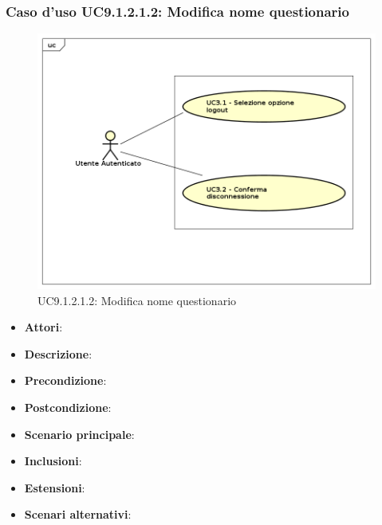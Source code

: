 					\subsubsection{Caso d'uso UC9.1.2.1.2: Modifica nome questionario}
					\label{UC9.1.2.1.2}
					\begin{figure}[h]
						\centering
					\includegraphics[scale=0.7,keepaspectratio]{UML/UC9.png}
						\caption{UC9.1.2.1.2: Modifica nome questionario}
					\end{figure}
					\FloatBarrier
					\begin{itemize}
						\item \textbf{Attori}: 
						\item \textbf{Descrizione}: 
						\item \textbf{Precondizione}: 
						\item \textbf{Postcondizione}: 
						\item \textbf{Scenario principale}:
						\item \textbf{Inclusioni}:
						\item \textbf{Estensioni}:
						\item \textbf{Scenari alternativi}:
					\end{itemize}
					
